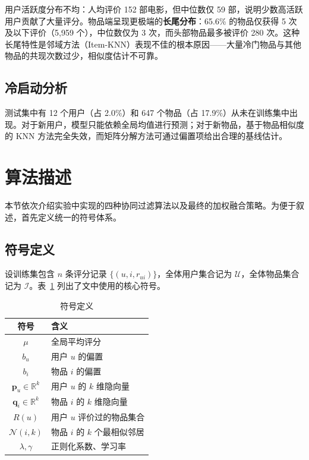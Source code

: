 \documentclass[UTF8,a4paper,10pt]{ctexart}
\begin{document}
用户活跃度分布不均：人均评价 152 部电影，但中位数仅 59 部，说明少数高活跃用户贡献了大量评分。物品端呈现更极端的\textbf{长尾分布}：65.6\% 的物品仅获得 5 次及以下评价（5,959 个），中位数仅为 3 次，而头部物品最多被评价 280 次。这种长尾特性是邻域方法（Item-KNN）表现不佳的根本原因——大量冷门物品与其他物品的共现次数过少，相似度估计不可靠。

\subsection{冷启动分析}

测试集中有 12 个用户（占 2.0\%）和 647 个物品（占 17.9\%）从未在训练集中出现。对于新用户，模型只能依赖全局均值进行预测；对于新物品，基于物品相似度的 KNN 方法完全失效，而矩阵分解方法可通过偏置项给出合理的基线估计。
\section{算法描述}

本节依次介绍实验中实现的四种协同过滤算法以及最终的加权融合策略。为便于叙述，首先定义统一的符号体系。

\subsection{符号定义}

设训练集包含 $n$ 条评分记录 $\{(u,i,r_{ui})\}$，全体用户集合记为 $\mathcal{U}$，全体物品集合记为 $\mathcal{I}$。表~\ref{tab:notation} 列出了文中使用的核心符号。

\begin{table}[htbp]
    \centering
    \setlength{\tabcolsep}{30pt}
    \caption{符号定义}
    \label{tab:notation}
    \begin{tabular}{@{}cl@{}}
        \toprule
        \textbf{符号} & \textbf{含义} \\
        \midrule
        $\mu$        & 全局平均评分 \\
        $b_u$        & 用户 $u$ 的偏置 \\
        $b_i$        & 物品 $i$ 的偏置 \\
        $\mathbf{p}_u \in \mathbb{R}^k$ & 用户 $u$ 的 $k$ 维隐向量 \\
        $\mathbf{q}_i \in \mathbb{R}^k$ & 物品 $i$ 的 $k$ 维隐向量 \\
        $R(u)$       & 用户 $u$ 评价过的物品集合 \\
        $\mathcal{N}(i,k)$ & 物品 $i$ 的 $k$ 个最相似邻居 \\
        $\lambda, \gamma$   & 正则化系数、学习率 \\
        \bottomrule
    \end{tabular}
\end{table}
\end{document}
